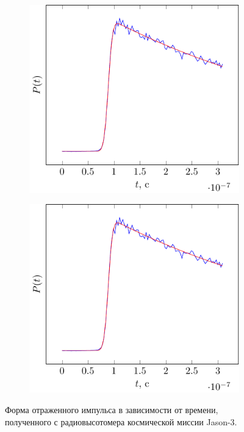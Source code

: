 \begin{figure}[ht]
\begin{subfigure}{0.49\linewidth}
        \includegraphics[width=\linewidth, page=2]{fig/retracking/real}
    \end{subfigure}
    \begin{subfigure}{0.49\linewidth}
        \centering
        \includegraphics[width=\linewidth, page=3]{fig/retracking/real}
    \end{subfigure}
    \caption{Форма отраженного импульса в зависимости от времени, полученного с
    радиовысотомера космической миссии Jason-3.}
    \label{fig:impulse_jason}
\end{figure}

